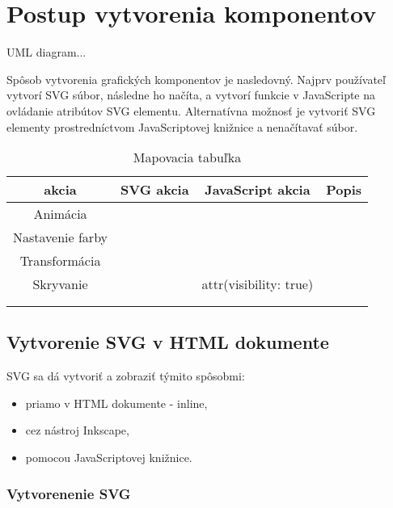 \chapter{Postup vytvorenia komponentov}

UML diagram... 

Spôsob vytvorenia grafických komponentov je nasledovný. Najprv používateľ vytvorí SVG súbor, následne ho načíta, a vytvorí funkcie v JavaScripte na ovládanie atribútov SVG elementu. 
Alternatívna možnosť je vytvoriť SVG elementy prostredníctvom JavaScriptovej knižnice a nenačítavať súbor. 


\begin{table}[hp]
	
\begin{center}
		\begin{tabular}{|c|c|c|c|}
		\hline \textbf{akcia} & \textbf{SVG akcia} & \textbf{JavaScript akcia} & \textbf{Popis} \\ 
		\hline Animácia &  &  &  \\ 
		\hline Nastavenie farby &  &  &  \\ 
		\hline Transformácia &  &  &  \\ 
		\hline Skryvanie  &  & attr({visibility: true}) &  \\ 
		\hline  &  &  &  \\ 
		\hline  &  &  &  \\ 
		\hline 
	\end{tabular} 
\end{center}
	
	\caption{Mapovacia tabuľka}
	\label{haha}
\end{table}

\section{Vytvorenie SVG v HTML dokumente}

SVG sa dá vytvoriť a zobraziť  týmito spôsobmi:
\begin{itemize}
	\item priamo v HTML dokumente - inline, 
	\item cez nástroj Inkscape,
	\item pomocou JavaScriptovej knižnice.
\end{itemize}


 \subsection{Vytvorenenie SVG }
 
